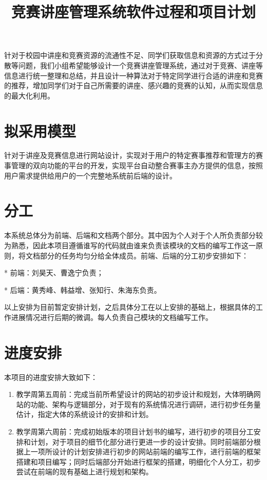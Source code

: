 \documentclass[12pt]{article}
\date{}
\title{\textbf{竞赛讲座管理系统软件过程和项目计划}}
\author{\rightline{SigmaGo小组}}
\begin{document}
\begin{CJK}{UTF8}{gbsn}
\begin{spacing}{1.3}
\maketitle
针对于校园中讲座和竞赛资源的流通性不足、同学们获取信息和资源的方式过于分散等问题，我们小组希望能够设计一个竞赛讲座管理系统，通过对于竞赛、讲座等信息进行统一整理和总结，并且设计一种算法对于特定同学进行合适的讲座和竞赛的推荐，增加同学们对于自己所需要的讲座、感兴趣的竞赛的认知，从而实现信息的最大化利用。

\section{拟采用模型}
\indent \indent
针对于讲座及竞赛信息进行网站设计，实现对于用户的特定赛事推荐和管理方的赛事管理的双向功能的平台的开发，实现平台自动整合赛事主办方提供的信息，按照用户需求提供给用户的一个完整地系统前后端的设计。

\section{分工}
\indent \indent
本系统总体分为前端、后端和文档两个部分。其中因为个人对于个人所负责部分较为熟悉，因此本项目遵循谁写的代码就由谁来负责该模块的文档的编写工作这一原则，将文档部分的任务均匀分给全体成员。前端、后端的分工初步安排如下：


* 前端：刘昊天、曹逸宁负责；
    
* 后端：黄秀峰、韩益增、张知行、朱海东负责。


以上安排为目前暂定安排计划，之后具体分工在以上安排的基础上，根据具体的工作进展情况进行后期的微调。每人负责自己模块的文档编写工作。


\section{进度安排}
\indent \indent
本项目的进度安排大致如下：
\begin{enumerate}
    \item 教学周第五周前：完成当前所希望设计的网站的初步设计和规划，大体明确网站的功能、架构与逻辑部分，对于现有的系统情况进行调研，进行初步任务量估计，指定大体的系统设计的安排和计划。
    
    \item 教学周第六周前：完成初始版本的项目计划书的编写，进行初步的项目分工安排和计划，对于项目的细节化部分进行更进一步的设计安排。同时前端部分根据上一项所设计的计划安排进行初步的网站前端的编写工作，进行前端的框架搭建和项目编写；同时后端部分开始进行框架的搭建，明细化个人分工，初步尝试在前端的现有基础上进行规划和架构。
    

\end{enumerate}
\end{spacing}
\end{CJK}
\end{document}
